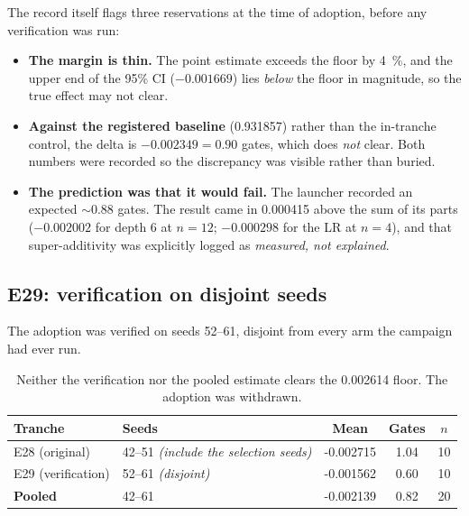 \documentclass[11pt,a4paper]{article}
\begin{document}
The record itself flags three reservations at the time of adoption, before any verification
was run:

\begin{itemize}[nosep,leftmargin=*]
  \item \textbf{The margin is thin.} The point estimate exceeds the floor by \SI{4}{\percent},
        and the upper end of the 95\% CI ($-0.001669$) lies \emph{below} the floor in
        magnitude, so the true effect may not clear.
  \item \textbf{Against the registered baseline} (\num{0.931857}) rather than the in-tranche
        control, the delta is $-0.002349 = 0.90$ gates, which does \emph{not} clear. Both
        numbers were recorded so the discrepancy was visible rather than buried.
  \item \textbf{The prediction was that it would fail.} The launcher recorded an expected
        $\sim$0.88 gates. The result came in \num{0.000415} above the sum of its parts
        ($-0.002002$ for depth 6 at $n=12$; $-0.000298$ for the LR at $n=4$), and that
        super-additivity was explicitly logged as \emph{measured, not explained}.
\end{itemize}

\subsection{E29: verification on disjoint seeds}

The adoption was verified on seeds 52--61, disjoint from every arm the campaign had ever
run.

\begin{table}[h]
\centering
\small
\begin{tabular}{@{}llS[table-format=-1.6]S[table-format=1.2]c@{}}
\toprule
\textbf{Tranche} & \textbf{Seeds} & {\textbf{Mean}} & {\textbf{Gates}} & \textbf{$n$} \\
\midrule
E28 (original)      & 42--51 \emph{(include the selection seeds)} & -0.002715 & 1.04 & 10 \\
E29 (verification)  & 52--61 \emph{(disjoint)}                    & -0.001562 & 0.60 & 10 \\
\textbf{Pooled}     & 42--61                                      & -0.002139 & 0.82 & 20 \\
\bottomrule
\end{tabular}
\caption{Neither the verification nor the pooled estimate clears the \num{0.002614} floor.
The adoption was withdrawn.}
\end{table}
\end{document}

